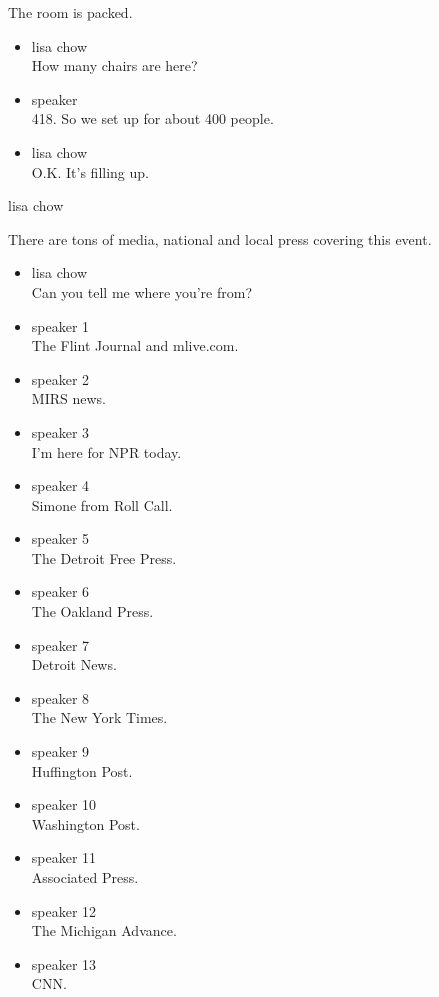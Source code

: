 The room is packed.

\begin{itemize}
\item
  lisa chow\\
  How many chairs are here?
\item
  speaker\\
  418. So we set up for about 400 people.
\item
  lisa chow\\
  O.K. It's filling up.
\end{itemize}

lisa chow

There are tons of media, national and local press covering this event.

\begin{itemize}
\item
  lisa chow\\
  Can you tell me where you're from?
\item
  speaker 1\\
  The Flint Journal and mlive.com.
\item
  speaker 2\\
  MIRS news.
\item
  speaker 3\\
  I'm here for NPR today.
\item
  speaker 4\\
  Simone from Roll Call.
\item
  speaker 5\\
  The Detroit Free Press.
\item
  speaker 6\\
  The Oakland Press.
\item
  speaker 7\\
  Detroit News.
\item
  speaker 8\\
  The New York Times.
\item
  speaker 9\\
  Huffington Post.
\item
  speaker 10\\
  Washington Post.
\item
  speaker 11\\
  Associated Press.
\item
  speaker 12\\
  The Michigan Advance.
\item
  speaker 13\\
  CNN.
\end{itemize}

